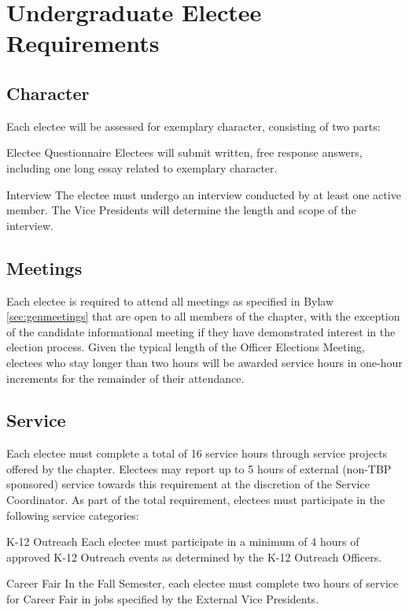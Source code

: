\chapter{Undergraduate Electee Requirements}\label{sec:ugradreqs}
\section{Character}
Each electee will be assessed for exemplary character, consisting of two parts:
\begin{enumsubsection}
  \item {Electee Questionnaire} Electees will submit written, free response answers, including one long essay related to exemplary character.
  \item {Interview} The electee must undergo an interview conducted by at least one active member. The Vice Presidents will determine the length and scope of the interview.
\end{enumsubsection}
\section{Meetings}
Each electee is required to attend all meetings as specified in Bylaw \ref{sec:genmeetings} that are open to all members of the chapter, with the exception of the 
candidate informational meeting if they have demonstrated interest in the election process. Given the typical length of the Officer Elections Meeting, 
electees who stay longer than two hours will be awarded service hours in one-hour increments for the remainder of their attendance.
\section{Service}
Each electee must complete a total of 16 service hours through service projects offered by the chapter. 
Electees may report up to 5 hours of external (non-TBP sponsored) service towards this requirement at the discretion of the Service Coordinator. 
As part of the total requirement, electees must participate in the following service categories:
\begin{enumsubsection}
  \item {K-12 Outreach} Each electee must participate in a minimum of 4 hours of approved K-12 Outreach events as determined by the K-12 Outreach Officers.
  \item {Career Fair} In the Fall Semester, each electee must complete two hours of service for Career Fair in jobs specified by the External Vice Presidents.
\end{enumsubsection}
